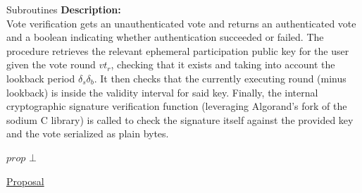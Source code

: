 \documentclass[10pt,a4paper]{article}
\begin{document}
\begin{section}{Subroutines}
\noindent \textbf{Description:}\\
Vote verification gets an unauthenticated vote and returns an authenticated vote and a
boolean indicating whether authentication succeeded or failed.
The procedure retrieves the relevant ephemeral participation public key for the user given the vote round $vt_r$,
checking that it exists and taking into account the lookback period $\delta_s\delta_b$.
It then checks that the currently executing round (minus lookback) is inside the validity interval for said key.
Finally, the internal cryptographic signature verification function (leveraging Algorand's fork of the sodium C library)
is called to check the signature itself against the provided key and the vote serialized as plain bytes.


        






\begin{algorithm}[H]
    \begin{algorithmic}[1]

        \State \Return $prop$
    \Else
        \State \Return $\bot$
    \EndIf

    \EndFunction
    \end{algorithmic}
    \caption{\underline{Proposal}}
\end{algorithm}


\end{section}
\end{document}
